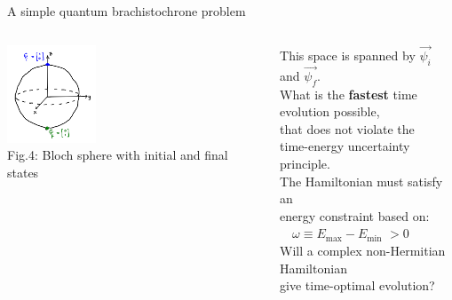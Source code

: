 \documentclass[10pt]{beamer}
\begin{document}
\begin{frame}{A simple quantum brachistochrone problem}
\begin{columns}
    \hspace{1.5em}
    \begin{column}{\textwidth}
    \includegraphics[width=0.35\textwidth]{bloch.png}\\
    \tiny{Fig.4: Bloch sphere with initial and final states}
    \end{column}
    \begin{column}{0.8\textwidth}
    \hspace{-18em}
    This space is spanned by $\vec{\psi_i}$ and $\vec{\psi_f}.$\\
    \vspace{0.4cm}
    \hspace{-18em}
    \pause
    What is the \textbf{fastest} time evolution possible,\\
    \hspace{-18em}
    that does not violate the\\
    \hspace{-18em}
     time-energy uncertainty principle.\\
    \vspace{0.4cm}
    \pause
    \hspace{-18em}
    The Hamiltonian must satisfy an\\ 
    \hspace{-18em}
    \textcolor{myNewColorD}{energy constraint} based on:\\
    \hspace{-15em}
    \textcolor{myNewColorD}{$\quad\omega  \equiv E_{\mathrm{max}} - E_{\mathrm{min}}$} $> 0$\\
    \vspace{0.7cm}
    \pause
    \hspace{-18em}
    \textcolor{myNewColorC}{Will a complex non-Hermitian Hamiltonian}\\
    \hspace{-18em}
    \textcolor{myNewColorC}{give time-optimal evolution?}
    \end{column}
    \end{columns}
\end{frame}
\end{document}
